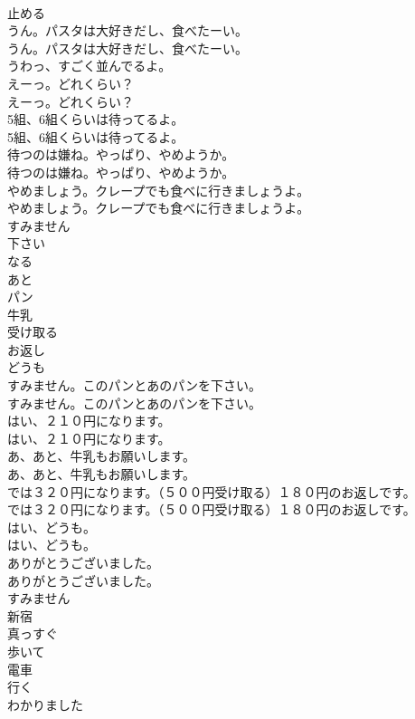 \documentclass[8pt]{extreport}
\begin{document}
\begin{CJK}{UTF8}{min}
\\	止める
\\	うん。パスタは大好きだし、食べたーい。	
\\	うん。パスタは大好きだし、食べたーい。 
\\	うわっ、すごく並んでるよ。 
\\	えーっ。どれくらい？	
\\	えーっ。どれくらい？ 
\\	5組、6組くらいは待ってるよ。	
\\	5組、6組くらいは待ってるよ。 
\\	待つのは嫌ね。やっぱり、やめようか。	
\\	待つのは嫌ね。やっぱり、やめようか。 
\\	やめましょう。クレープでも食べに行きましょうよ。	
\\	やめましょう。クレープでも食べに行きましょうよ。 
\\	すみません
\\	下さい
\\	なる
\\	あと
\\	パン
\\	牛乳
\\	受け取る
\\	お返し
\\	どうも
\\	すみません。このパンとあのパンを下さい。	
\\	すみません。このパンとあのパンを下さい。 
\\	はい、２１０円になります。	
\\	はい、２１０円になります。 
\\	あ、あと、牛乳もお願いします。	
\\	あ、あと、牛乳もお願いします。 
\\	では３２０円になります。（５００円受け取る）１８０円のお返しです。	
\\	では３２０円になります。（５００円受け取る）１８０円のお返しです。 
\\	はい、どうも。	
\\	はい、どうも。 
\\	ありがとうございました。	
\\	ありがとうございました。 
\\	すみません
\\	新宿
\\	真っすぐ
\\	歩いて
\\	電車
\\	行く
\\	わかりました

\end{CJK}
\end{document}
